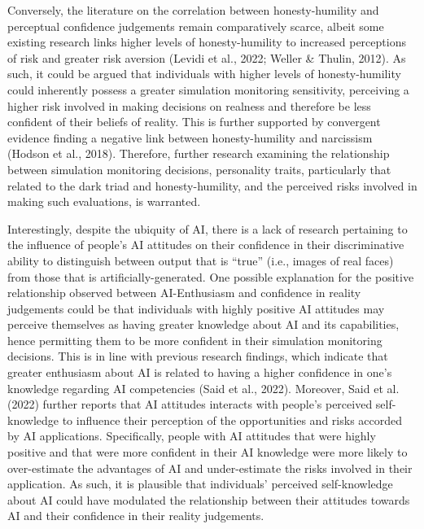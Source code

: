 \documentclass[
  man,floatsintext]{apa6}
\begin{document}
Conversely, the literature on the correlation between honesty-humility and perceptual confidence judgements remain comparatively scarce, albeit some existing research links higher levels of honesty-humility to increased perceptions of risk and greater risk aversion (Levidi et al., 2022; Weller \& Thulin, 2012). As such, it could be argued that individuals with higher levels of honesty-humility could inherently possess a greater simulation monitoring sensitivity, perceiving a higher risk involved in making decisions on realness and therefore be less confident of their beliefs of reality. This is further supported by convergent evidence finding a negative link between honesty-humility and narcissism (Hodson et al., 2018). Therefore, further research examining the relationship between simulation monitoring decisions, personality traits, particularly that related to the dark triad and honesty-humility, and the perceived risks involved in making such evaluations, is warranted.

Interestingly, despite the ubiquity of AI, there is a lack of research pertaining to the influence of people's AI attitudes on their confidence in their discriminative ability to distinguish between output that is ``true'' (i.e., images of real faces) from those that is artificially-generated. One possible explanation for the positive relationship observed between AI-Enthusiasm and confidence in reality judgements could be that individuals with highly positive AI attitudes may perceive themselves as having greater knowledge about AI and its capabilities, hence permitting them to be more confident in their simulation monitoring decisions. This is in line with previous research findings, which indicate that greater enthusiasm about AI is related to having a higher confidence in one's knowledge regarding AI competencies (Said et al., 2022). Moreover, Said et al. (2022) further reports that AI attitudes interacts with people's perceived self-knowledge to influence their perception of the opportunities and risks accorded by AI applications. Specifically, people with AI attitudes that were highly positive and that were more confident in their AI knowledge were more likely to over-estimate the advantages of AI and under-estimate the risks involved in their application. As such, it is plausible that individuals' perceived self-knowledge about AI could have modulated the relationship between their attitudes towards AI and their confidence in their reality judgements.
\end{document}
